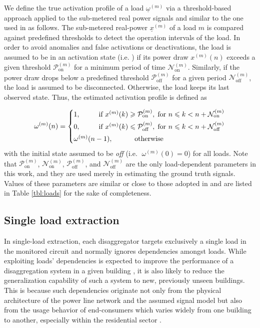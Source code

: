 \documentclass[twocolumn,letter,10pt]{IEEEtran} %
\begin{document}
We define the true activation profile of a load $\underline{\omega}^{(m)}$ via a threshold-based approach applied to the sub-metered real power signals and similar to the one used in \cite{Kelly_2015} as follows.
The sub-metered real-power $\underline{x}^{(m)}$ of a load $m$ is compared against predefined thresholds to detect the operation intervals of the load. In order to avoid anomalies and false activations or deactivations, the load is assumed to be in an activation state (i.e. \on) if its power draw $x^{(m)}(n)$ exceeds a given threshold $\mathcal{P}_{\text{on}}^{(m)}$ for a minimum period of time $\mathcal{N}_{\text{on}}^{(m)}$. Similarly, if the power draw drops below a predefined threshold $\mathcal{P}_{\text{off}}^{(m)}$ for a given period $\mathcal{N}_{\text{off}}^{(m)}$, the load is assumed to be disconnected. Otherwise, the load keeps its last observed state. Thus, the estimated activation profile is defined as

{\small\begin{equation*}
	\omega^{(m)}(n) =
	\begin{cases}
	1, & \hspace{-10mm}\text{if } x^{(m)}(k) \geqslant \mathcal{P}_{\text{on}}^{(m)}, \; \text{for } n \leqslant k < n+\mathcal{N}_{\text{on}}^{(m)}\\[1mm]
	0, & \hspace{-10mm}\text{if } x^{(m)}(k) \leqslant \mathcal{P}_{\text{off}}^{(m)}, \; \text{for } n \leqslant k < n+\mathcal{N}_{\text{off}}^{(m)}\\[1mm]
	\omega^{(m)}(n-1),	& \hspace{8mm} \text{otherwise}
	\end{cases}
	\end{equation*}}%
with the initial state assumed to be \emph{off} (i.e. $\;\omega^{(m)}(0) = 0$) for all loads. Note that $\mathcal{P}^{(m)}_{\text{on}}$, $\mathcal{N}^{(m)}_{\text{on}}$, $\mathcal{P}^{(m)}_{\text{off}}$, and $\mathcal{N}^{(m)}_{\text{off}}$ are the only load-dependent parameters in this work, and they are used merely in estimating the ground truth signals. Values of these parameters are similar or close to those adopted in \cite{Kelly_2015} and are listed in Table \ref{tbl:loads} for the sake of completeness.

\subsection{Single load extraction}

In single-load extraction, each disaggregator targets exclusively a single load in the monitored circuit and normally ignores dependencies amongst loads. While exploiting loads' dependencies is expected to improve the performance of a disaggregation system in a given building \cite{Kim_2010, Kolter_2010_SparseCoding, Makonin_2014_PhD}, it is also likely to reduce the generalization capability of such a system to new, previously unseen buildings. This is because such dependencies originate not only from the physical architecture of the power line network and the assumed signal model but also from the usage behavior of end-consumers which varies widely from one building to another, especially within the residential sector \cite{Batra_2014_Comparison}.
\end{document}
